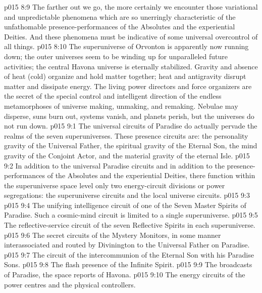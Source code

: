 \vs p015 8:9 The farther out we go, the more certainly we encounter those variational and unpredictable phenomena which are so unerringly characteristic of the unfathomable presence\hyp{}performances of the Absolutes and the experiential Deities. And these phenomena must be indicative of some universal overcontrol of all things.
\vs p015 8:10 The superuniverse of Orvonton is apparently now running down; the outer universes seem to be winding up for unparalleled future activities; the central Havona universe is eternally stabilized. Gravity and absence of heat (cold) organize and hold matter together; heat and antigravity disrupt matter and dissipate energy. The living power directors and force organizers are the secret of the special control and intelligent direction of the endless metamorphoses of universe making, unmaking, and remaking. Nebulae may disperse, suns burn out, systems vanish, and planets perish, but the universes do not run down.
\vs p015 9:1 The universal circuits of Paradise do actually pervade the realms of the seven superuniverses. These presence circuits are: the personality gravity of the Universal Father, the spiritual gravity of the Eternal Son, the mind gravity of the Conjoint Actor, and the material gravity of the eternal Isle.
\vs p015 9:2 In addition to the universal Paradise circuits and in addition to the presence\hyp{}performances of the Absolutes and the experiential Deities, there function within the superuniverse space level only two energy\hyp{}circuit divisions or power segregations: the superuniverse circuits and the local universe circuits.
\vs p015 9:3 \pc {}
\vs p015 9:4 \bibnobreakspace The unifying intelligence circuit of one of the Seven Master Spirits of Paradise. Such a cosmic\hyp{}mind circuit is limited to a single superuniverse.
\vs p015 9:5 \bibnobreakspace The reflective\hyp{}service circuit of the seven Reflective Spirits in each superuniverse.
\vs p015 9:6 \bibnobreakspace The secret circuits of the Mystery Monitors, in some manner interassociated and routed by Divinington to the Universal Father on Paradise.
\vs p015 9:7 \bibnobreakspace The circuit of the intercommunion of the Eternal Son with his Paradise Sons.
\vs p015 9:8 \bibnobreakspace The flash presence of the Infinite Spirit.
\vs p015 9:9 \bibnobreakspace The broadcasts of Paradise, the space reports of Havona.
\vs p015 9:10 \bibnobreakspace The energy circuits of the power centres and the physical controllers.
